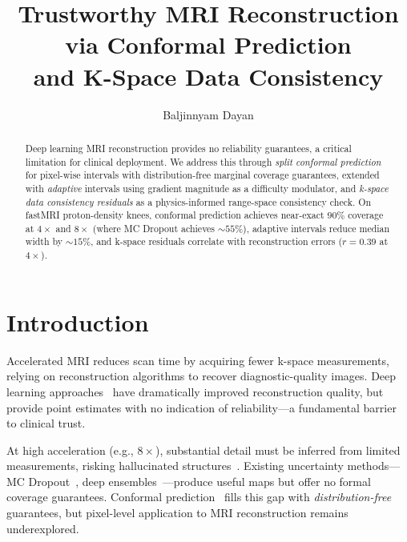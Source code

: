 \documentclass[runningheads]{llncs}
\begin{document}
\title{Trustworthy MRI Reconstruction via Conformal Prediction\\and K-Space Data Consistency}

\author{Baljinnyam Dayan}
\institute{}

\maketitle

\begin{abstract}
    Deep learning MRI reconstruction provides no reliability guarantees, a critical limitation for clinical deployment. We address this through \emph{split conformal prediction} for pixel-wise intervals with distribution-free marginal coverage guarantees, extended with \emph{adaptive} intervals using gradient magnitude as a difficulty modulator, and \emph{k-space data consistency residuals} as a physics-informed range-space consistency check. On fastMRI proton-density knees, conformal prediction achieves near-exact $90\%$ coverage at $4{\times}$ and $8{\times}$ (where MC Dropout achieves ${\sim}55\%$), adaptive intervals reduce median width by ${\sim}15\%$, and k-space residuals correlate with reconstruction errors ($r{=}0.39$ at $4{\times}$).

\end{abstract}

\section{Introduction}

Accelerated MRI reduces scan time by acquiring fewer k-space measurements, relying on reconstruction algorithms to recover diagnostic-quality images. Deep learning approaches~\cite{ronneberger2015unet,hammernik2018varnet,sriram2020e2evarnet,schlemper2018cascade} have dramatically improved reconstruction quality, but provide point estimates with no indication of reliability---a fundamental barrier to clinical trust.

At high acceleration (e.g., $8{\times}$), substantial detail must be inferred from limited measurements, risking hallucinated structures~\cite{bhadra2021hallucinations}. Existing uncertainty methods---MC Dropout~\cite{gal2016dropout}, deep ensembles~\cite{lakshminarayanan2017ensembles}---produce useful maps but offer no formal coverage guarantees. Conformal prediction~\cite{shafer2008tutorial,angelopoulos2023gentle} fills this gap with \emph{distribution-free} guarantees, but pixel-level application to MRI reconstruction remains underexplored.
\end{document}

